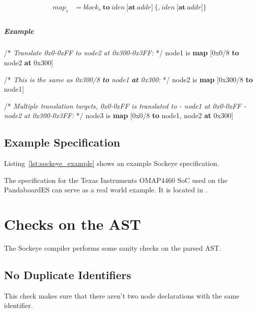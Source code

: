 \documentclass[a4paper,11pt,twoside]{report}
\begin{document}
{{{\begin{align*}
\textit{map}_s & \mathop{=}
\textit{block}_s\ \textbf{to}\ \textit{iden}\ 
	\Big[
		\textbf{at}\ \textit{addr}
	\Big]\
	\Big\{
		\textbf{,}\ \textit{iden}\ 
		\Big[
			\textbf{at}\ \textit{addr}
		\Big]
	\Big\} \\
\end{align*}

\paragraph{Example}
\begin{syntax}
	/* \textit{Translate \textup{0x0-0xFF} to \textup{node2} at \textup{0x300-0x3FF}:} */
	node1 is \textbf{map} [0x0/8 \textbf{to} node2 \textbf{at} 0x300] 

	/* \textit{This is the same as \textup{0x300/8 \textbf{to} node1 \textbf{at} 0x300}:} */
	node2 is \textbf{map} [0x300/8 \textbf{to} node1]

	/* \textit{Multiple translation targets, \textup{0x0-0xFF} is translated to
	   - \textup{node1} at \textup{0x0-0xFF}
	   - \textup{node2} at \textup{0x300-0x3FF}:} */
	node3 is \textbf{map} [0x0/8 \textbf{to} node1, node2 \textbf{at} 0x300]
\end{syntax}

\section{Example Specification}
Listing~\ref{lst:sockeye_example} shows an example Sockeye specification.



The specification for the Texas Instruments OMAP4460 SoC used on the PandaboardES can serve as a real world example. It is located in .


\chapter{Checks on the AST}
\label{chap:checks}
The Sockeye compiler performs some sanity checks on the parsed AST.

\section{No Duplicate Identifiers}
This check makes sure that there aren't two node declarations with the same identifier.

}}}
\end{document}
